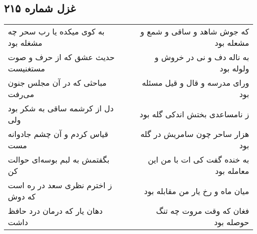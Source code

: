 \begin{center}
\section*{غزل شماره ۲۱۵}
\label{sec:sh215}
\begin{longtable}{l p{0.5cm} r}
به کوی میکده یا رب سحر چه مشغله بود
&&
که جوش شاهد و ساقی و شمع و مشعله بود
\\
حدیث عشق که از حرف و صوت مستغنیست
&&
به ناله دف و نی در خروش و ولوله بود
\\
مباحثی که در آن مجلس جنون می‌رفت
&&
ورای مدرسه و قال و قیل مسئله بود
\\
دل از کرشمه ساقی به شکر بود ولی
&&
ز نامساعدی بختش اندکی گله بود
\\
قیاس کردم و آن چشم جادوانه مست
&&
هزار ساحر چون سامریش در گله بود
\\
بگفتمش به لبم بوسه‌ای حوالت کن
&&
به خنده گفت کی ات با من این معامله بود
\\
ز اخترم نظری سعد در ره است که دوش
&&
میان ماه و رخ یار من مقابله بود
\\
دهان یار که درمان درد حافظ داشت
&&
فغان که وقت مروت چه تنگ حوصله بود
\\
\end{longtable}
\end{center}
